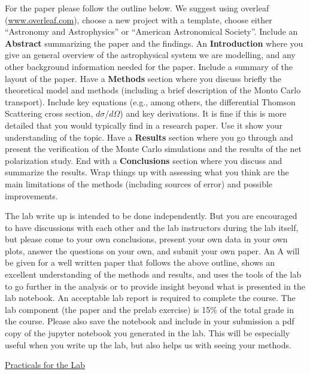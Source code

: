 \documentclass[12pt]{amsart}
\begin{document}
For the paper please follow the outline below.  We suggest using
overleaf (\url{www.overleaf.com}), choose a new project with a
template, choose either ``Astronomy and Astrophysics'' or ``American
Astronomical Society''. Include an {\bf{Abstract}} summarizing the
paper and the findings.  An {\bf{Introduction}} where you give an
general overview of the astrophysical system we are modelling, and any
other background information needed for the paper. Include a summary
of the layout of the paper. Have a {\bf{Methods}} section where you
discuss briefly the theoretical model and methods (including a brief
description of the Monto Carlo transport).  Include key equations
(e.g., among others, the differential Thomson Scattering cross
section, $d\sigma/d\Omega$) and key derivations. It is fine if this is
more detailed that you would typically find in a research paper. Use
it show your understanding of the topic.  Have a {\bf{Results}}
section where you go through and present the verification of the Monte
Carlo simulations and the results of the net polarization study. End
with a {\bf{Conclusions}} section where you discuss and summarize the
results. Wrap things up with assessing what you think are the main
limitations of the methods (including sources of error) and possible
improvements.  \newline

The lab write up is intended to be done independently. But you are
encouraged to have discussions with each other and the lab instructors
during the lab itself, but please come to your own conclusions,
present your own data in your own plots, answer the questions on your
own, and submit your own paper. An A will be given for a well written
paper that follows the above outline, shows an excellent understanding
of the methods and results, and uses the tools of the lab to go
further in the analysis or to provide insight beyond what is
presented in the lab notebook. An acceptable lab report is required to
complete the course.  The lab component (the paper and the prelab
exercise) is 15\% of the total grade in the course. Please also save
the notebook and include in your submission a pdf copy of the jupyter
notebook you generated in the lab.  This will be especially useful
when you write up the lab, but also helps us with seeing your methods.

\newpage

\centerline{\Large \underline{Practicals for the Lab} }
\vspace*{0.5cm}
\end{document}
